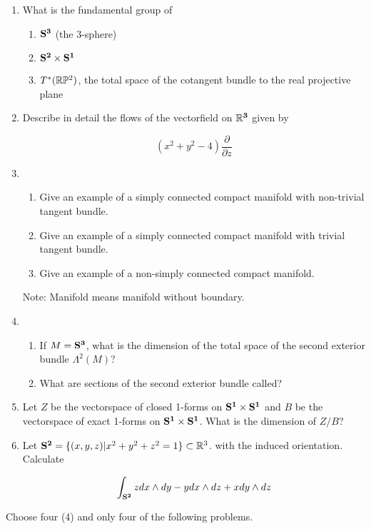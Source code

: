 \begin{enumerate}
\item What is the fundamental group of
	\begin{enumerate}
	\item ${\bf S^3}$ (the 3-sphere)
	\item ${\bf S^2}\times {\bf S^1}$
	\item $T^*({\Bbb R}{\Bbb P}^2)$, the total 
space of the cotangent bundle 
to the real projective plane
	\end{enumerate}

\item Describe in detail the flows of the vectorfield on ${\Bbb R}^{\bf 3}$
given by

\[ (x^2 + y^2 - 4) \frac{\partial}{\partial z} \]


\item \begin{enumerate}
	\item Give an example of a simply connected compact manifold 
		with non-trivial tangent bundle.
	\item Give an example of a simply connected compact manifold 
		with trivial tangent bundle.
	\item Give an example of a non-simply connected compact manifold.
	\end{enumerate}
Note: Manifold means manifold without boundary.

\item 
\begin{enumerate}
\item If $M = {\bf S^3}$, what is the dimension of the total space
of the second exterior bundle $\Lambda ^2(M)$?
\item What are sections of the second exterior bundle called?
\end{enumerate}

\item Let $Z$ be the vectorspace of closed 1-forms on 
${\bf S^1}\times {\bf S^1}$ and $B$ be the vectorspace of exact 1-forms on
${\bf S^1}\times {\bf S^1}$. What is the dimension of $Z/B$?

\item Let ${\bf S^2} = \{(x,y,z) | x^2+y^2+z^2 = 1 \} \subset {\Bbb R}^3$.
with the induced orientation.  Calculate

\[ \int_{\bf S^2} z dx\wedge dy - y dx\wedge dz + x dy\wedge dz \]  
\end{enumerate}
\newpage

 Choose four (4) and only four of the following
problems.


